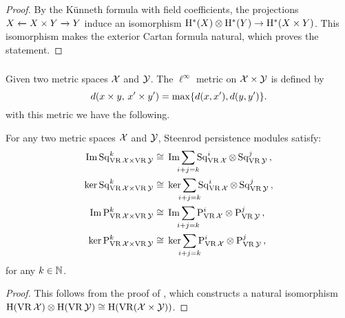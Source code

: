 \begin{proof}
	By the K\"unneth formula with field coefficients, the projections $X \xleftarrow{} X \times Y \xrightarrow{} Y$ induce an isomorphism $\mathrm{H}^*(X) \otimes \mathrm{H}^*(Y) \to \mathrm{H}^*(X \times Y)$.
	This isomorphism makes the exterior Cartan formula natural, which proves the statement.
\end{proof}

\subsubsection{}

Given two metric spaces $\mathcal{X}$ and $\mathcal{Y}$.
The $\ell^\infty$ metric on $\mathcal{X} \times \mathcal{Y}$ is defined by
\[
d(x \times y, \, x' \times y') = \max\{d(x,x'), d(y,y')\}.
\]
with this metric we have the following.

\medskip\corollary
For any two metric spaces $\mathcal{X}$ and $\mathcal{Y}$,
Steenrod persistence modules satisfy:
\begin{align*}
	\img\Sq^k_{\VR\cX \times \VR\cY} &\cong\, \img\sum_{\mathclap{i+j=k}} \Sq^i_{\VR\cX} \ot \Sq^j_{\VR\cY}\,, \\ \ker\Sq^k_{\VR\cX \times \VR\cY} &\cong\, \ker\sum_{\mathclap{i+j=k}} \Sq^i_{\VR\cX} \ot \Sq^j_{\VR\cY}\,, \\
	\img\rP^k_{\VR\cX \times \VR\cY} &\cong\, \img\sum_{\mathclap{i+j=k}} \rP^i_{\VR\cX} \otimes \rP^j_{\VR\cY}\,, \\ 
	\ker\rP^k_{\VR\cX \times \VR\cY} &\cong\, \ker\sum_{\mathclap{i+j=k}} \rP^i_{\VR\cX} \otimes \rP^j_{\VR\cY}\,,
\end{align*}
for any $k \in \mathbb{N}$.

\begin{proof}
	This follows from the proof of \cite[Theorem~6.1(1)]{lim2020vietoris}, which constructs a natural isomorphism $\mathrm{H}(\operatorname{VR}\mathcal{X}) \otimes \mathrm{H}(\operatorname{VR}\mathcal{Y}) \cong \mathrm{H}(\operatorname{VR}(\mathcal{X} \times \mathcal{Y}))$.
\end{proof}